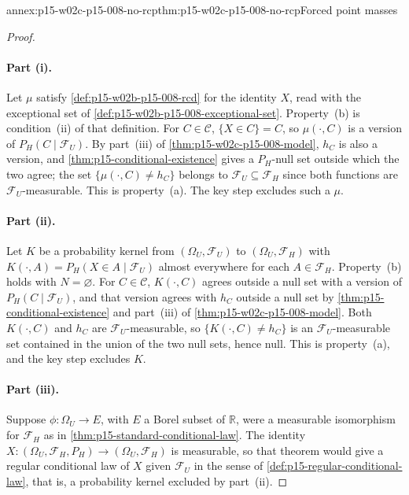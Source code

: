 \begin{annexitem}{annex:p15-w02c-p15-008-no-rcp}{thm:p15-w02c-p15-008-no-rcp}{Forced point masses}
\begin{proof}
\paragraph{Part (i).}
Let \(\mu\) satisfy \cref{def:p15-w02b-p15-008-rcd} for the identity
\(X\), read with the exceptional set of
\cref{def:p15-w02b-p15-008-exceptional-set}. Property~(b) is condition~(ii)
of that definition. For \(C\in\mathcal C\), \(\{X\in C\}=C\), so
\(\mu(\cdot,C)\) is a version of \(P_H(C\mid\mathcal F_U)\). By
part~(iii) of \cref{thm:p15-w02c-p15-008-model}, \(h_C\) is also a
version, and \cref{thm:p15-conditional-existence} gives a \(P_H\)-null
set outside which the two agree; the set
\(\{\mu(\cdot,C)\neq h_C\}\) belongs to \(\mathcal F_U\subseteq\mathcal F_H\)
since both functions are \(\mathcal F_U\)-measurable. This is
property~(a). The key step excludes such a \(\mu\).

\paragraph{Part (ii).}
Let \(K\) be a probability kernel from \((\Omega_U,\mathcal F_U)\) to
\((\Omega_U,\mathcal F_H)\) with \(K(\cdot,A)=P_H(X\in A\mid\mathcal F_U)\)
almost everywhere for each \(A\in\mathcal F_H\). Property~(b) holds with
\(N=\varnothing\). For \(C\in\mathcal C\), \(K(\cdot,C)\) agrees outside a
null set with a version of \(P_H(C\mid\mathcal F_U)\), and that version
agrees with \(h_C\) outside a null set by
\cref{thm:p15-conditional-existence} and part~(iii) of
\cref{thm:p15-w02c-p15-008-model}. Both \(K(\cdot,C)\) and \(h_C\) are
\(\mathcal F_U\)-measurable, so \(\{K(\cdot,C)\neq h_C\}\) is an
\(\mathcal F_U\)-measurable set contained in the union of the two null
sets, hence null. This is property~(a), and the key step excludes \(K\).

\paragraph{Part (iii).}
Suppose \(\phi:\Omega_U\to E\), with \(E\) a Borel subset of
\(\mathbb R\), were a measurable isomorphism for \(\mathcal F_H\) as in
\cref{thm:p15-standard-conditional-law}. The identity
\(X:(\Omega_U,\mathcal F_H,P_H)\to(\Omega_U,\mathcal F_H)\) is measurable,
so that theorem would give a regular conditional law of \(X\) given
\(\mathcal F_U\) in the sense of \cref{def:p15-regular-conditional-law},
that is, a probability kernel excluded by part~(ii).


\end{proof}
\end{annexitem}
